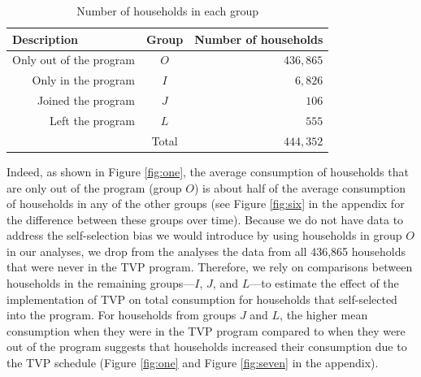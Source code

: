 \documentclass[12pt]{article}
\begin{document}
\begin{table}[]
\centering
\caption{Number of households in each group}
\label{tab:groups}
\begin{tabular}{@{}rcr@{}}
\toprule
\multicolumn{1}{l}{\textbf{Description}} & \multicolumn{1}{l}{\textbf{Group}} & \multicolumn{1}{l}{\textbf{Number of households}} \\ \midrule
Only out of the program & $O$   & $436,865$ \\
Only in the program     & $I$   & $6,826$   \\
Joined the program      & $J$   & $106$     \\
Left the program        & $L$   & $555$     \\ \midrule
                        & Total & $444,352$ \\ \bottomrule
\end{tabular}
\end{table}

Indeed, as shown in Figure \ref{fig:one}, the average consumption of households that are only out of the program (group $O$) is about half of the average consumption of households in any of the other groups (see Figure \ref{fig:six} in the appendix for the difference between these groups over time). Because we do not have data to address the self-selection bias we would introduce by using households in group $O$ in our analyses, we drop from the analyses the data from all 436,865 households that were never in the TVP program. Therefore, we rely on comparisons between households in the remaining groups---$I$, $J$, and  $L$---to estimate the effect of the implementation of TVP on total consumption for households that self-selected into the program. For households from groups $J$ and $L$, the higher mean consumption when they were in the TVP program compared to when they were out of the program suggests that households increased their consumption due to the TVP schedule (Figure \ref{fig:one} and Figure \ref{fig:seven} in the appendix).
\end{document}
